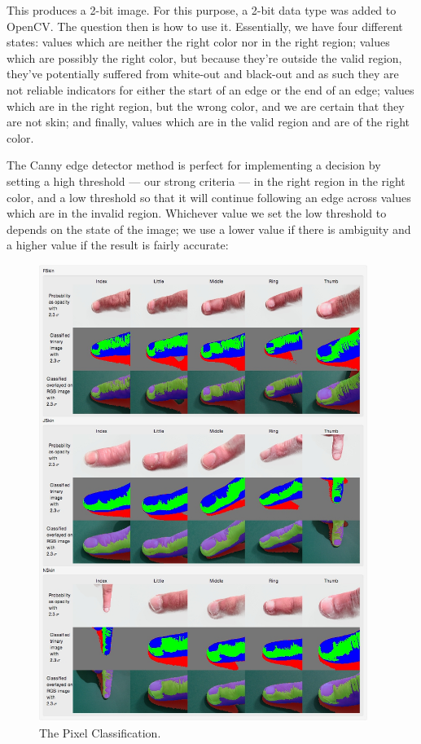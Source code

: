 This produces a 2-bit image. For this purpose, a 2-bit data type was added to OpenCV. The question then is how to use it. Essentially, we have four different states: values which are neither the right color nor in the right region; values which are possibly the right color, but because they're outside the valid region, they've potentially suffered from white-out and black-out and as such they are not reliable indicators for either the start of an edge or the end of an edge; values which are in the right region, but the wrong color, and we are certain that they are not skin; and finally, values which are in the valid region and are of the right color.

The Canny edge detector method is perfect for implementing a decision by setting a high threshold --- our strong criteria --- in the right region in the right color, and a low threshold so that it will continue following an edge across values which are in the invalid region. Whichever value we set the low threshold to depends on the state of the image; we use a lower value if there is ambiguity and a higher value if the result is fairly accurate:
 
\begin{figure}[h!]
  \centering
    \includegraphics[width=0.95\textwidth]{Chapter4/Figs/ClassifiedSkin.jpg}
    \caption{The Pixel Classification.}\label{fig:2BitImage}
\end{figure}

